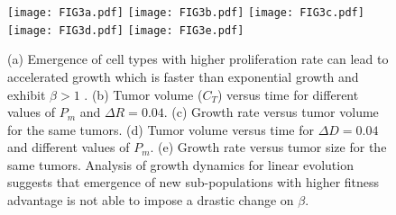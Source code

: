 \documentclass[aps,prl, superscriptaddress,groupedaddress]{revtex4}  %
\begin{document}
	\begin{figure} 
		\centering
		\texttt{[image: FIG3a.pdf]}
		\texttt{[image: FIG3b.pdf]} 
		\texttt{[image: FIG3c.pdf]} 
		\texttt{[image: FIG3d.pdf]} 
		\texttt{[image: FIG3e.pdf]} 
		\caption{(a) Emergence of cell types with higher proliferation rate can lead to accelerated growth which is faster than exponential growth and exhibit $\beta>1$ \cite{durrett2010evolutionary, Victor2020superlinear}.  (b) Tumor volume ($C_T$) versus time for different values of $P_m$ and $\Delta R=0.04$. (c) Growth rate versus tumor volume for the same tumors.  (d) Tumor volume versus time for $\Delta D=0.04$ and different values of $P_m$. (e) Growth rate versus tumor size for the same tumors.  Analysis of growth dynamics for linear evolution suggests that emergence of new sub-populations with higher fitness advantage is not able to impose a drastic change on $\beta$.}
		\label{FIG3}
	\end{figure}
	
	
\end{document}

